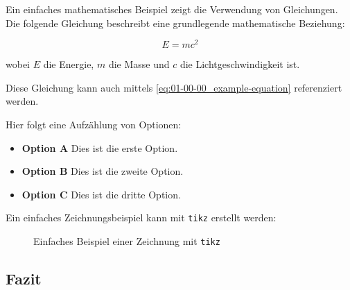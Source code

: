 \lipsum[7-9]

Ein einfaches mathematisches Beispiel zeigt die Verwendung von Gleichungen. Die folgende Gleichung beschreibt eine grundlegende mathematische Beziehung:

\begin{equation}
    E = mc^2
\end{equation}
\label{eq:01-00-00_example-equation}

wobei \(E\) die Energie, \(m\) die Masse und \(c\) die Lichtgeschwindigkeit ist.

Diese Gleichung kann auch mittels \autoref{eq:01-00-00_example-equation} referenziert werden.

\lipsum[10]

Hier folgt eine Aufzählung von Optionen:

\begin{itemize}[label={}, rightmargin=2.5cm]
    \item \textbf{Option A}	\dotfill	Dies ist die erste Option.
    \item \textbf{Option B}	\dotfill	Dies ist die zweite Option.
    \item \textbf{Option C}	\dotfill	Dies ist die dritte Option.
\end{itemize}

\lipsum[11]

Ein einfaches Zeichnungsbeispiel kann mit \texttt{tikz} erstellt werden:

\begin{minipage}[htp]{\textwidth}
    \begin{figure}[H]
        \centering
        \caption{Einfaches Beispiel einer Zeichnung mit \texttt{tikz}}
        \label{fig:01-00-00_example-tikz-drawing}
    \end{figure}
\end{minipage}

\subsection{Fazit}
\label{subsec:01-00-01_conclusion}


